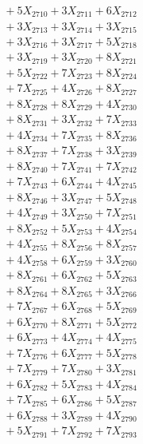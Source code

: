 \documentclass[a4paper,10pt]{article}
\begin{document}
{\begin{align}
&\;  + 5 X_{2710} + 3 X_{2711} + 6 X_{2712} \\[0.3ex]
&\;  + 3 X_{2713} + 3 X_{2714} + 3 X_{2715} \\[0.3ex]
&\;  + 3 X_{2716} + 3 X_{2717} + 5 X_{2718} \\[0.3ex]
&\;  + 3 X_{2719} + 3 X_{2720} + 8 X_{2721} \\[0.3ex]
&\;  + 5 X_{2722} + 7 X_{2723} + 8 X_{2724} \\[0.3ex]
&\;  + 7 X_{2725} + 4 X_{2726} + 8 X_{2727} \\[0.3ex]
&\;  + 8 X_{2728} + 8 X_{2729} + 4 X_{2730} \\[0.3ex]
&\;  + 8 X_{2731} + 3 X_{2732} + 7 X_{2733} \\[0.3ex]
&\;  + 4 X_{2734} + 7 X_{2735} + 8 X_{2736} \\[0.3ex]
&\;  + 8 X_{2737} + 7 X_{2738} + 3 X_{2739} \\[0.5ex]\allowbreak
&\;  + 8 X_{2740} + 7 X_{2741} + 7 X_{2742} \\[0.3ex]
&\;  + 7 X_{2743} + 6 X_{2744} + 4 X_{2745} \\[0.3ex]
&\;  + 8 X_{2746} + 3 X_{2747} + 5 X_{2748} \\[0.3ex]
&\;  + 4 X_{2749} + 3 X_{2750} + 7 X_{2751} \\[0.3ex]
&\;  + 8 X_{2752} + 5 X_{2753} + 4 X_{2754} \\[0.3ex]
&\;  + 4 X_{2755} + 8 X_{2756} + 8 X_{2757} \\[0.3ex]
&\;  + 4 X_{2758} + 6 X_{2759} + 3 X_{2760} \\[0.3ex]
&\;  + 8 X_{2761} + 6 X_{2762} + 5 X_{2763} \\[0.3ex]
&\;  + 8 X_{2764} + 8 X_{2765} + 3 X_{2766} \\[0.3ex]
&\;  + 7 X_{2767} + 6 X_{2768} + 5 X_{2769} \\[0.5ex]\allowbreak
&\;  + 6 X_{2770} + 8 X_{2771} + 5 X_{2772} \\[0.3ex]
&\;  + 6 X_{2773} + 4 X_{2774} + 4 X_{2775} \\[0.3ex]
&\;  + 7 X_{2776} + 6 X_{2777} + 5 X_{2778} \\[0.3ex]
&\;  + 7 X_{2779} + 7 X_{2780} + 3 X_{2781} \\[0.3ex]
&\;  + 6 X_{2782} + 5 X_{2783} + 4 X_{2784} \\[0.3ex]
&\;  + 7 X_{2785} + 6 X_{2786} + 5 X_{2787} \\[0.3ex]
&\;  + 6 X_{2788} + 3 X_{2789} + 4 X_{2790} \\[0.3ex]
&\;  + 5 X_{2791} + 7 X_{2792} + 7 X_{2793} \\[0.3ex]

\end{align}}
\end{document}

